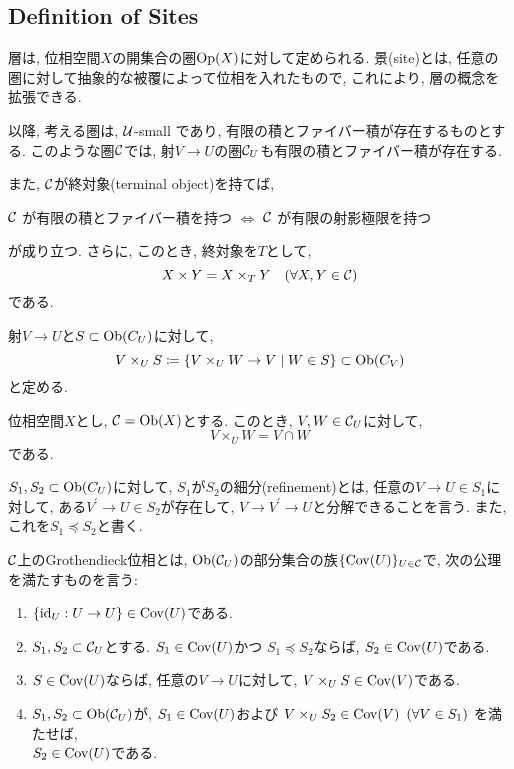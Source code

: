 \documentclass[../main]{subfiles}
\begin{document}
\setcounter{section}{2}
\setcounter{subsection}{1} \addtocounter{subsection}{-1}
\subsection{Definition of Sites}
層は, 位相空間$X$の開集合の圏$\mathrm{Op}(X)$に対して定められる.
景(site)とは, 任意の圏に対して抽象的な被覆によって位相を入れたもので,
これにより, 層の概念を拡張できる.

以降, 考える圏は, $\mathcal{U}$-small であり,
有限の積とファイバー積が存在するものとする.
このような圏$\mathcal{C}$では,
射$V\to U$の圏$\mathcal{C}_U$も有限の積とファイバー積が存在する.

また, $\mathcal{C}$が終対象(terminal object)を持てば,
\begin{center}
  $\mathcal{C}$ が有限の積とファイバー積を持つ
  $\iff$
  $\mathcal{C}$ が有限の射影極限を持つ
\end{center}
が成り立つ.
さらに, このとき, 終対象を$T$として,
\[
  X\times Y = X\times_T Y \hspace{1em} (\forall X, Y\in \mathcal{C})
\]
である.

\begin{sym*}
  射$V\to U$と$S\subset \mathrm{Ob}(C_U)$に対して,
  \[
    V\times_U S
    \coloneqq
    \left\{
      V \times_U W \to V
      \mathrel{}\middle|\mathrel{}
      W\in S
      \right\} \subset \mathrm{Ob}(C_V)
  \]
  と定める.
\end{sym*}

\begin{rem*}
  位相空間$X$とし, $\mathcal{C} = \mathrm{Ob}(X)$とする.
  このとき,
  $V,W\in\mathcal{C}_U$に対して,
  \[
    V\times_U W = V\cap W
  \]
  である.
\end{rem*}

\begin{dfn}
  $S_1,S_2\subset \mathrm{Ob}(C_U)$に対して,
  $S_1$が$S_2$の細分(refinement)とは,
  任意の$V\to U \in S_1$に対して,
  ある$V^\prime\to U\in S_2$が存在して,
  $V\to V^\prime \to U$と分解できることを言う.
  また, これを$S_1 \preceq S_2$と書く.
\end{dfn}

\begin{dfn}
  $\mathcal{C}$上のGrothendieck位相とは,
  $\mathrm{Ob}(\mathcal{C}_U)$の部分集合の族$\{\mathrm{Cov}(U)\}_{U\in\mathcal{C}}$で,
  次の公理を満たすものを言う:
  \begin{enumerate}[(GT1)]
    \setlength{\itemindent}{1em} \setlength{\labelsep}{1em}
    \item $\left\{ \mathrm{id}_U : U\to U \right\} \in \mathrm{Cov}(U)$である.
    \item $S_1, S_2\subset\mathcal{C}_U$とする.
      $S_1\in\mathrm{Cov}(U)$かつ
      $S_1\preceq S_2$ならば,
      $S_2\in\mathrm{Cov}(U)$である.
    \item $S\in\mathrm{Cov}(U)$ならば,
      任意の$V\to U$に対して,
      $V\times_U S\in \mathrm{Cov}(V)$である.
    \item $S_1,S_2\subset\mathrm{Ob}(\mathcal{C}_U)$が,
      $S_1\in\mathrm{Cov}(U)$および
      $V\times_U S_2\in\mathrm{Cov}(V)\hspace{0.5em}(\forall V\in S_1)$
      を満たせば,
      \\
      $S_2\in\mathrm{Cov}(U)$である.
  \end{enumerate}
\end{dfn}
\end{document}
